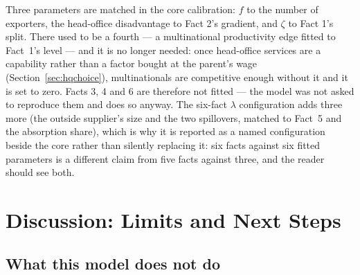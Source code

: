 \documentclass[11pt]{article}
\theoremstyle{plain}
\theoremstyle{remark}
\theoremstyle{definition}
\begin{document}
Three parameters are matched in the core calibration: $f$ to the number of exporters,
the head-office disadvantage to Fact 2's gradient, and $\zeta$ to Fact 1's split.
There used to be a fourth --- a multinational productivity edge fitted to Fact~1's
level --- and it is no longer needed: once head-office services are a capability
rather than a factor bought at the parent's wage (Section~\ref{sec:hqchoice}),
multinationals are competitive enough without it and it is set to zero. Facts 3, 4
and 6 are therefore not fitted --- the model was not asked to reproduce them and does
so anyway. The six-fact $\lambda$ configuration adds three more (the outside
supplier's size and the two spillovers, matched to Fact~5 and the absorption share),
which is why it is reported as a named configuration beside the core rather than
silently replacing it: six facts against six fitted parameters is a different claim
from five facts against three, and the reader should see both.

\newpage
\section{Discussion: Limits and Next Steps}

\subsection{What this model does not do}
\end{document}
